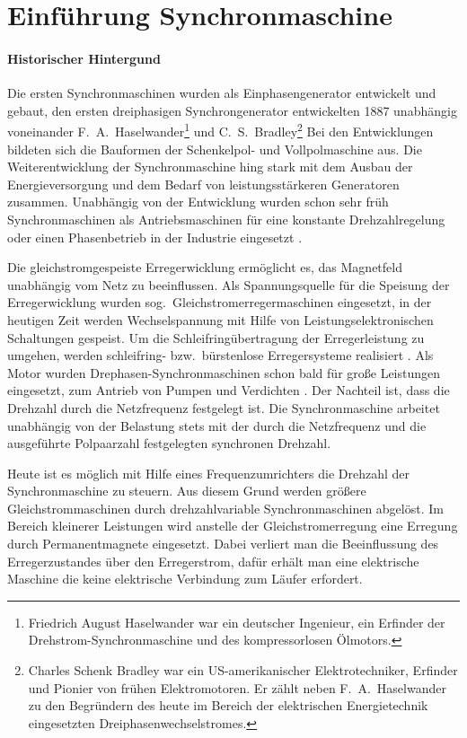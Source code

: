 \section{Einführung Synchronmaschine}\label{sec:synchron}

\paragraph{Historischer Hintergund} Die ersten Synchronmaschinen wurden als Einphasengenerator entwickelt und gebaut, den ersten dreiphasigen Synchrongenerator entwickelten 1887 unabhängig voneinander F.~A.~Haselwander\footnote{Friedrich August Haselwander war ein deutscher Ingenieur, ein Erfinder der Drehstrom-Synchronmaschine und des kompressorlosen Ölmotors.} und C.~S.~Bradley\footnote{Charles Schenk Bradley war ein US-amerikanischer Elektrotechniker, Erfinder und Pionier von frühen Elektromotoren. Er zählt neben F.~A.~Haselwander zu den Begründern des heute im Bereich der elektrischen Energietechnik eingesetzten Dreiphasenwechselstromes.} Bei den Entwicklungen bildeten sich die Bauformen der Schenkelpol- und Vollpolmaschine aus. Die Weiterentwicklung der Synchronmaschine hing stark mit dem Ausbau der Energieversorgung und dem Bedarf von leistungsstärkeren Generatoren zusammen. Unabhängig von der Entwicklung wurden schon sehr früh Synchronmaschinen als Antriebsmaschinen für eine konstante Drehzahlregelung oder einen Phasenbetrieb in der Industrie eingesetzt \autocites[S.~108f.]{ternes2012}[S.~287]{fischer2009}[S.~485f.]{mullerI2005}.

Die gleichstromgespeiste Erregerwicklung ermöglicht es, das Magnetfeld unabhängig vom Netz zu beeinflussen.
Als Spannungsquelle für die Speisung der Erregerwicklung wurden sog.\ Gleichstromerregermaschinen eingesetzt, in der heutigen Zeit werden Wechselspannung mit Hilfe von Leistungselektronischen Schaltungen gespeist.
Um die Schleifringübertragung der Erregerleistung zu umgehen, werden schleifring- bzw.\ bürstenlose Erregersysteme realisiert \autocite[S.~108]{ternes2012}.
Als Motor wurden Drephasen-Synchronmaschinen schon bald für große Leistungen eingesetzt, \zB zum Antrieb von Pumpen und Verdichten \autocite[S.~486]{mullerI2005}.
Der Nachteil ist, dass die Drehzahl durch die Netzfrequenz festgelegt ist.
Die Synchronmaschine arbeitet unabhängig von der Belastung stets mit der durch die Netzfrequenz und die ausgeführte Polpaarzahl festgelegten synchronen Drehzahl.

Heute ist es möglich mit Hilfe eines Frequenzumrichters die Drehzahl der Synchronmaschine zu steuern.
Aus diesem Grund werden größere Gleichstrommaschinen durch drehzahlvariable Synchronmaschinen abgelöst.
Im Bereich kleinerer Leistungen wird anstelle der Gleichstromerregung eine Erregung durch Permanentmagnete eingesetzt.
Dabei verliert man die Beeinflussung des Erregerzustandes über den Erregerstrom, dafür erhält man eine elektrische Maschine die keine elektrische Verbindung zum Läufer erfordert.


